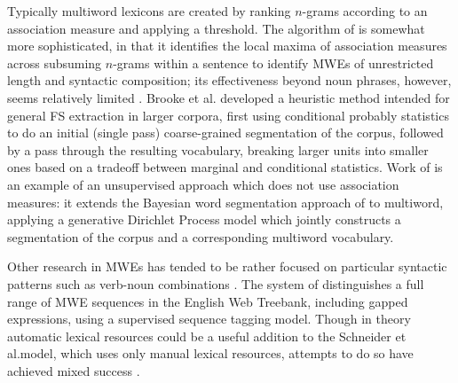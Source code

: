 \documentclass[11pt,letterpaper]{article}
\makeatletter
\def \al {al.\@ }
\makeatother
\begin{document}
Typically multiword lexicons are created by ranking $n$-grams according to an association measure and applying a threshold. The algorithm of  is somewhat more sophisticated, in that it identifies the local maxima of association measures across subsuming $n$-grams within a sentence to identify MWEs of unrestricted length and syntactic composition; its effectiveness beyond noun phrases, however, seems relatively limited \cite{Ramisch12}. Brooke et \al {} developed a heuristic method intended for general FS extraction in larger corpora, first using conditional probably statistics to do an initial (single pass) coarse-grained segmentation of the corpus, followed by a pass through the resulting vocabulary, breaking larger units into smaller ones based on a tradeoff between marginal and conditional statistics. Work of  is an example of an unsupervised approach which does not use association measures: it extends the Bayesian word segmentation approach of  to multiword, applying a generative Dirichlet Process model which jointly constructs a segmentation of the corpus and a corresponding multiword vocabulary.

Other research in MWEs has tended to be rather focused on particular syntactic patterns such as verb-noun combinations \cite{Fazly09}. The system of  distinguishes a full range of MWE sequences in the English Web Treebank, including gapped expressions, using a supervised sequence tagging model. Though in theory automatic lexical resources could be a useful addition to the Schneider et \al model, which uses only manual lexical resources, attempts to do so have achieved mixed success \cite{Riedl16}. 
\end{document}

